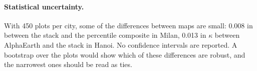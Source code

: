 \paragraph{Statistical uncertainty.} With 450 plots per city, some of the
differences between maps are small: 0.008 in \Rsq{} between the stack and the
percentile composite in Milan, 0.013 in $\kappa$ between AlphaEarth and the
stack in Hanoi. No confidence intervals are reported. A bootstrap over the
plots would show which of these differences are robust, and the narrowest
ones should be read as ties.
